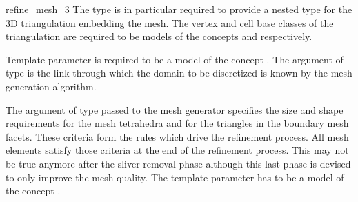 \begin{ccRefFunction}{refine_mesh_3}
The type  is in particular required to provide a nested type
 for the 3D triangulation
embedding the mesh. The vertex and cell base classes of the
triangulation  are required to be models of the
concepts  and 
respectively.

Template parameter  is required to be a model of
the concept  . The argument  of type
 is the link through which the domain
to be discretized is known  by the mesh generation algorithm. 



The argument of
type  passed to the mesh generator specifies the
size and shape requirements for the mesh tetrahedra
and for the triangles in the boundary mesh facets. These criteria
form the rules which drive the refinement process. All mesh elements
satisfy those criteria at the end of the refinement process.
This may not be true anymore after the sliver removal phase although this
last phase is devised to only improve the mesh quality.
The template parameter  has to be a model of the concept
. 
 

\ccSeeAlso


\end{ccRefFunction}

\ccRefPageEnd


